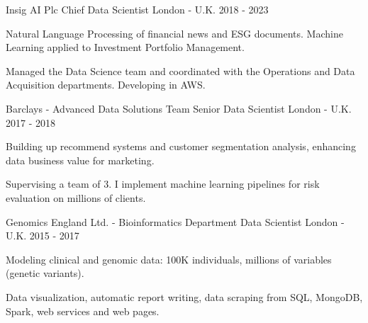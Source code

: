 \begin{cventries}

\cventry
{Insig AI Plc} %
{Chief Data Scientist} %
{London - U.K.} %
{2018 - 2023} %
{ %
\begin{cvitems}
\item {Natural Language Processing of financial news and ESG documents. Machine Learning applied to Investment Portfolio Management.}
\item {Managed the Data Science team and coordinated with the Operations and Data Acquisition departments. Developing in AWS.}
\end{cvitems}
}


\cventry
{Barclays - Advanced Data Solutions Team} %
{Senior Data Scientist} %
{London - U.K.} %
{2017 - 2018} %
{ %
\begin{cvitems}
\item {Building up recommend systems and customer segmentation analysis, enhancing data business value for marketing.}
\item {Supervising a team of 3. I implement machine learning pipelines for risk evaluation on millions of clients.}
\end{cvitems}
}


\cventry
{Genomics England Ltd. - Bioinformatics Department} %
{Data Scientist} %
{London - U.K.} %
{2015 - 2017} %
{ %
\begin{cvitems}
\item {Modeling clinical and genomic data: 100K individuals, millions of variables (genetic variants).}
\item {Data visualization, automatic report writing, data scraping from SQL, MongoDB, Spark, web services and web pages.}
\end{cvitems}
}


\end{cventries}
